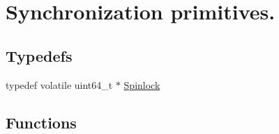 \hypertarget{group__sync__hal}{}\section{Synchronization primitives.}
\label{group__sync__hal}
\subsection*{Typedefs}
\begin{DoxyCompactItemize}
\item 
typedef volatile uint64\+\_\+t $\ast$ \hyperlink{group__sync__hal_ga2b7bd1f01b65ccbfaee98f004746ae8b}{Spinlock}
\end{DoxyCompactItemize}
\subsection*{Functions}
